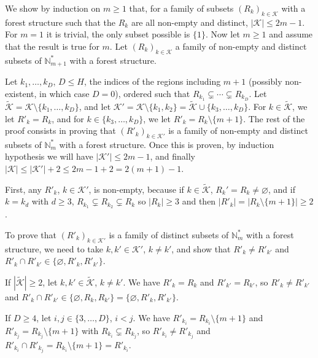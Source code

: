 \documentclass[
  11pt,
  a4paper,
]{article}
\theoremstyle{plain}
\theoremstyle{plain}
\theoremstyle{definition}
\theoremstyle{plain}
\theoremstyle{definition}
\theoremstyle{remark}
\begin{document}
We show by induction on \(m\geq1\) that, for a family of subsets
\((R_k)_{k\in\mathcal{K}}\) with a forest structure such that the
\(R_k\) are all non-empty and distinct, \(|\mathcal{K}|\leq 2m-1\). For
\(m=1\) it is trivial, the only subset possible is \(\{1\}\). Now let
\(m\geq 1\) and assume that the result is true for \(m\). Let
\((R_k)_{k\in\mathcal{K}}\) a family of non-empty and distinct subsets
of \(\mathbb N_{m+1}^*\) with a forest structure.

Let \(k_1, \dotsc, k_D\), \(D\leq H\), the indices of the regions
including \(m+1\) (possibly non-existent, in which case \(D=0\)),
ordered such that \(R_{k_1}\subsetneq\dotsb\subsetneq R_{k_D}\). Let
\(\widetilde{\mathcal{K}}=\mathcal{K}\setminus\{k_1, \dotsc, k_D\}\),
and let
\(\mathcal{K}'=\mathcal{K}\setminus\{k_1, k_2\}=\widetilde{\mathcal{K}}\cup\{k_3, \dotsc, k_D\}\).
For \(k\in \widetilde{\mathcal{K}}\), we let \(R'_k=R_k\), and for
\(k\in\{k_3, \dotsc, k_D\}\), we let \(R'_k=R_k\setminus\{m+1\}\). The
rest of the proof consists in proving that \((R'_k)_{k\in\mathcal{K}'}\)
is a family of non-empty and distinct subsets of \(\mathbb{N}_m^*\) with
a forest structure. Once this is proven, by induction hypothesis we will
have \(|\mathcal{K}'|\leq 2m-1\), and finally
\(|\mathcal{K}|\leq |\mathcal{K}'|+2\leq 2m-1+2=2(m+1)-1\).

First, any \(R'_k\), \(k\in\mathcal{K}'\), is non-empty, because if
\(k\in\widetilde{\mathcal{K}}\), \(R_k'=R_k\neq\varnothing\), and if
\(k=k_d\) with \(d\geq3\), \(R_{k_1}\subsetneq R_{k_2}\subsetneq R_k\)
so \(|R_k|\geq 3\) and then \(|R'_k|=|R_k\setminus\{m+1\}|\geq2\).

To prove that \((R'_k)_{k\in\mathcal{K}'}\) is a family of distinct
subsets of \(\mathbb{N}_m^*\) with a forest structure, we need to take
\(k, k'\in\mathcal{K}'\), \(k\neq k'\), and show that
\(R'_k\neq R'_{k'}\) and
\(R'_k\cap R'_{k'}\in\{\varnothing, R'_k, R'_{k'}\}\).

If \(|\widetilde{\mathcal{K}}|\geq2\), let
\(k, k'\in\widetilde{\mathcal{K}}\), \(k\neq k'\). We have \(R'_k=R_k\)
and \(R'_{k'}=R_{k'}\), so \(R'_k\neq R'_{k'}\) and
\(R'_k\cap R'_{k'}\in\{\varnothing, R_k, R_{k'}\}=\{\varnothing, R'_k, R'_{k'}\}\).

If \(D\geq 4\), let \(i, j\in\{3,\dotsc, D\}\), \(i<j\). We have
\(R'_{k_i}=R_{k_i}\setminus\{m+1\}\) and
\(R'_{k_j}=R_{k_j}\setminus\{m+1\}\) with \(R_{k_i}\subsetneq R_{k_j}\),
so \(R'_{k_i}\neq R'_{k_j}\) and
\(R'_{k_i}\cap R'_{k_j}=R_{k_i}\setminus\{m+1\}=R'_{k_i}\).
\end{document}
